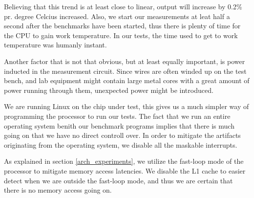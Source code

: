 Believing that this trend is at least close to linear, output will increase by
0.2\% pr.  degree Celcius increased. Also, we start our measurements at leat
half a second after the benchmarks have been started, thus there is plenty of
time for the CPU to gain work temperature. In our tests, the time used to get to
work temperature was humanly instant.

Another factor that is not that obvious, but at least equally important, is
power inducted in the measurement circuit. Since wires are often winded up on
the test bench, and lab equipment might contain large metal cores with a great
amount of power running through them, unexpected power might be introduced.

We are running Linux on the chip under test, this gives us a much simpler way of
programming the processor to run our tests. The fact that we run an entire
operating system benith our benchmark programs implies that there is much going
on that we have no direct controll over.  In order to mitigate the artifacts
originating from the operating system, we disable all the maskable interrupts.

As explained in section \ref{arch_experiments}, we utilize the fast-loop mode of
the processor to mitigate memory access latencies. We disable the L1 cache to
easier detect when we are outside the fast-loop mode, and thus we are certain
that there is no memory access going on.
